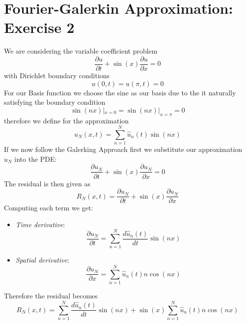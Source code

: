 \section{Fourier-Galerkin Approximation: Exercise 2}
We are considering the variable coefficient problem
\begin{equation}
	\frac{\partial u}{\partial t}+\sin (x) \frac{\partial u}{\partial x}=0
	\label{eq:pde2}
\end{equation}
with Dirichlet boundary conditions
\begin{equation}
	u(0,t) = u(\pi, t) = 0
	\label{eq:bdc2}
\end{equation}
For our Basis function we choose the sine as our basis due to the it naturally satisfying the boundary condition
\begin{equation}
	\sin(nx) |_{x=0} = \sin(nx) |_{x=\pi} = 0
	\label{eq:sin_bdc}
\end{equation}
therefore we define for the approximation
\begin{equation}
	u_N(x, t) = \sum_{n=1}^{N} \hat{u}_n(t) \sin(nx)
	\label{eq:uN2}
\end{equation}
If we now follow the Galerking Approach first we substitute our approximation $u_N$ into the PDE:
\begin{equation}
	\frac{\partial u_N}{\partial t}+\sin (x) \frac{\partial u_N}{\partial x}=0
	\label{eq:un_pde2}
\end{equation}
The residual is then given as
\begin{equation}
	R_N(x, t) = \frac{\partial u_N}{\partial t}+\sin (x) \frac{\partial u_N}{\partial x}
\end{equation}
Computing each term we get:
\begin{itemize}
	\item \textit{Time derivative}:
	      \begin{equation}
		      \frac{\partial u_N}{\partial t} = \sum_{n=1}^{N} \frac{d\hat{u}_n(t)}{dt} \sin(nx)
		      \label{eq:tim_derv2}
	      \end{equation}
	\item \textit{Spatial derivative}:
	      \begin{equation}
		      \frac{\partial u_N}{\partial x} = \sum_{n=1}^{N} \hat{u}_n(t) n \cos(nx)
		      \label{eq:spat_derv2}
	      \end{equation}
\end{itemize}
Therefore the residual becomes
\begin{equation}
	R_N(x, t) =  \sum_{n=1}^{N} \frac{d\hat{u}_n(t)}{dt} \sin(nx) + \sin(x)  \sum_{n=1}^{N} \hat{u}_n(t) n \cos(nx)
\end{equation}
